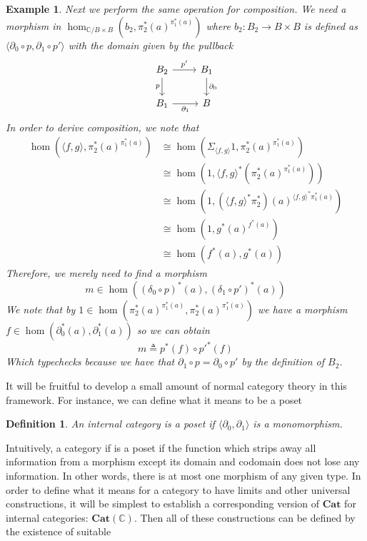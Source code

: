 \documentclass[12pt]{amsart}
\newcommand{\cat}[1]{\ensuremath{\mathbf{#1}}}
\newcommand{\Ccat}{\ensuremath{\mathbb{C}}}
\newtheorem{example}[thm]{Example}
\newtheorem{defn}[thm]{Definition}
\begin{document}
\begin{example}
  Next we perform the same operation for composition. We need a
  morphism in $\hom_{\Ccat/B \times B}(b_2, \pi_2^*(a)^{\pi_1^*(a)})$
  where $b_2 : B_2 \to B \times B$ is defined as
  $\langle \partial_0 \circ p, \partial_1 \circ p' \rangle$
  with the domain given by the pullback
  \[
    \begin{tikzcd}
      B_2 \ar[r, "p'"] \ar[d, swap, "p"] & B_1 \ar[d, "\partial_0"]\\
      B_1 \ar[r, swap, "\partial_1"] & B
    \end{tikzcd}
  \]
  In order to derive composition, we note that
  \begin{align*}
    \hom(\langle f, g \rangle, \pi_2^*(a)^{\pi_1^*(a)})
    &\cong \hom(\Sigma_{\langle f, g \rangle} 1, \pi_2^*(a)^{\pi_1^*(a)})\\
    &\cong \hom(1, \langle f, g \rangle^*(\pi_2^*(a)^{\pi_1^*(a)}))\\
    &\cong \hom(1, (\langle f, g \rangle^*\pi_2^*)(a)^{\langle f, g \rangle^*\pi_1^*(a)})\\
    &\cong \hom(1, g^*(a)^{f^*(a)})\\
    &\cong \hom(f^*(a), g^*(a))
  \end{align*}
  Therefore, we merely need to find a morphism
  \[
    m \in \hom((\delta_0 \circ p)^*(a), (\delta_1 \circ p')^*(a))
  \]
  We note that by
  $1 \in \hom(\pi_2^*(a)^{\pi_1^*(a)}, \pi_2^*(a)^{\pi_1^*(a)})$ we
  have a morphism
  $f \in \hom(\partial_0^*(a), \partial_1^*(a))$ so we can obtain
  \[
    m \triangleq p^*(f) \circ p'^*(f)
  \]
  Which typechecks because we have that
  $\partial_1 \circ p = \partial_0 \circ p'$ by the definition of
  $B_2$.
\end{example}
It will be fruitful to develop a small amount of normal category
theory in this framework. For instance, we can define what it means to
be a poset
\begin{defn}\label{defn:internal:poset}
  An internal category is a poset if
  $\langle \partial_0, \partial_1 \rangle$ is a monomorphism.
\end{defn}
Intuitively, a category if is a poset if the function which strips
away all information from a morphism except its domain and codomain
does not lose any information. In other words, there is at most one
morphism of any given type. In order to define what it means for a
category to have limits and other universal constructions, it will be
simplest to establish a corresponding version of $\cat{Cat}$ for
internal categories: $\cat{Cat}(\Ccat)$. Then all of these
constructions can be defined by the existence of suitable
\end{document}
